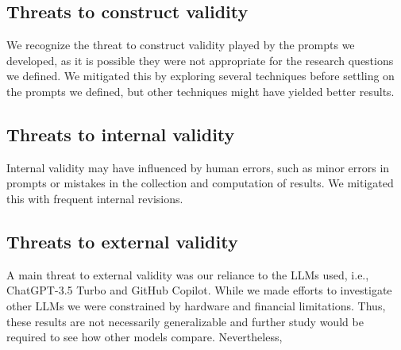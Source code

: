 \subsection{Threats to construct validity}

We recognize the threat to construct validity played by the prompts we developed, as it is possible they were not appropriate for the research questions
we defined. We mitigated this by exploring several techniques  before settling on the prompts we defined, but other techniques might have yielded better
results.

\subsection{Threats to internal validity}

Internal validity may have influenced by human errors, such as minor errors in prompts or mistakes in the collection and computation of results.
We mitigated this with frequent internal revisions. %

\subsection{Threats to external validity}

A main threat to external validity was our reliance to the LLMs used, i.e., ChatGPT-3.5 Turbo and GitHub Copilot. While we made efforts to investigate other LLMs
we were constrained by hardware and financial limitations. Thus, these results are not necessarily generalizable and further study would be required to see how other models compare.  Nevertheless, 

